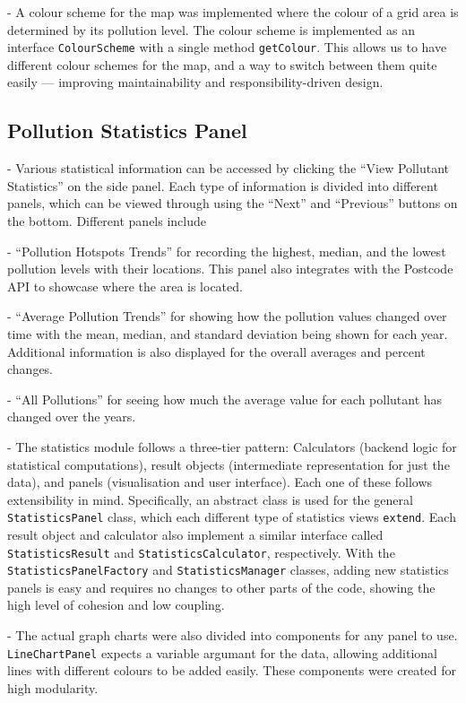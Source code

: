\documentclass[../main.tex]{subfiles}
\begin{document}
    - A colour scheme for the map was implemented where the colour of a grid area is determined by its pollution level. The colour scheme is implemented as an interface \verb|ColourScheme| with a single method \verb|getColour|. This allows us to have different colour schemes for the map, and a way to switch between them quite easily — improving maintainability and responsibility-driven design.

\subsection{Pollution Statistics Panel}
    - Various statistical information can be accessed by clicking the “View Pollutant Statistics” on the side panel. Each type of information is divided into different panels, which can be viewed through using the “Next” and “Previous” buttons on the bottom. Different panels include
    
    - “Pollution Hotspots Trends” for recording the highest, median, and the lowest pollution levels with their locations. This panel also integrates with the Postcode API to showcase where the area is located.
    
    - “Average Pollution Trends” for showing how the pollution values changed over time with the mean, median, and standard deviation being shown for each year. Additional information is also displayed for the overall averages and percent changes.
    
    - “All Pollutions” for seeing how much the average value for each pollutant has changed over the years.
    
    - The statistics module follows a three-tier pattern: Calculators (backend logic for statistical computations), result objects (intermediate representation for just the data), and panels (visualisation and user interface). Each one of these follows extensibility in mind. Specifically, an abstract class is used for the general \verb|StatisticsPanel| class, which each different type of statistics views \verb|extend|. Each result object and calculator also implement a similar interface called \verb|StatisticsResult| and \verb|StatisticsCalculator|, respectively. With the \verb|StatisticsPanelFactory| and \verb|StatisticsManager| classes, adding new statistics panels is easy and requires no changes to other parts of the code, showing the high level of cohesion and low coupling.
    
    - The actual graph charts were also divided into components for any panel to use. \verb|LineChartPanel| expects a variable argumant for the data, allowing additional lines with different colours to be added easily. These components were created for high modularity.
    
\end{document}
